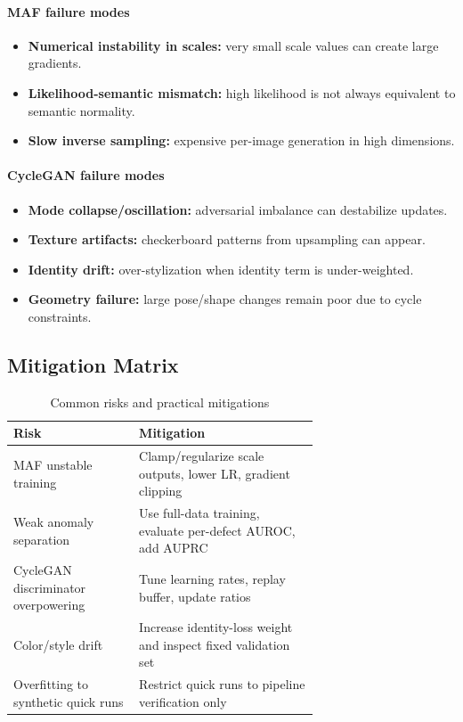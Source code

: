 \documentclass[conference]{IEEEtran}
\begin{document}
\paragraph{MAF failure modes}
\begin{itemize}
\item \textbf{Numerical instability in scales:} very small scale values can create large gradients.
\item \textbf{Likelihood-semantic mismatch:} high likelihood is not always equivalent to semantic normality.
\item \textbf{Slow inverse sampling:} expensive per-image generation in high dimensions.
\end{itemize}

\paragraph{CycleGAN failure modes}
\begin{itemize}
\item \textbf{Mode collapse/oscillation:} adversarial imbalance can destabilize updates.
\item \textbf{Texture artifacts:} checkerboard patterns from upsampling can appear.
\item \textbf{Identity drift:} over-stylization when identity term is under-weighted.
\item \textbf{Geometry failure:} large pose/shape changes remain poor due to cycle constraints.
\end{itemize}

\subsection{Mitigation Matrix}
\begin{table}[!t]
\centering
\caption{Common risks and practical mitigations}
\begin{tabular}{>{\raggedright}p{0.28\linewidth} >{\raggedright\arraybackslash}p{0.40\linewidth}}
\toprule
Risk & Mitigation \\
\midrule
MAF unstable training & Clamp/regularize scale outputs, lower LR, gradient clipping \\
Weak anomaly separation & Use full-data training, evaluate per-defect AUROC, add AUPRC \\
CycleGAN discriminator overpowering & Tune learning rates, replay buffer, update ratios \\
Color/style drift & Increase identity-loss weight and inspect fixed validation set \\
Overfitting to synthetic quick runs & Restrict quick runs to pipeline verification only \\
\bottomrule
\end{tabular}
\end{table}
\end{document}
